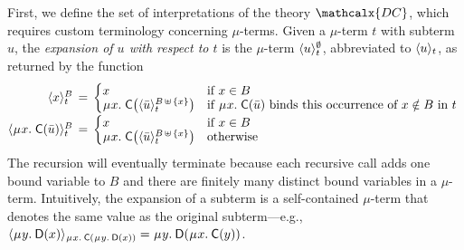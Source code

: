 \documentclass[smallcondensed,draft]{svjour3}
\newcommand\MU{\vvthinspace\mu\vvthinspace}
\newcommand\const[1]{\textsf{#1}}
\renewcommand{\vec}[1]{\bar #1}
\newcommand{\expand}[2]{\langle \smash{#2} \rangle_{#1}}
\newcommand{\thD}{\mathcalx{DC}}
\newcommand\vvthinspace{\kern+0.041667em}
\begin{document}
First, we define the set of interpretations of the theory $\thD$,
which requires custom terminology concerning $\mu$-terms.
Given a $\mu$-term $t$ with subterm $u$,
the \emph{expansion of $u$ with respect to $t$} is the $\mu$-term $\expand{t}{u}^\emptyset$,
abbreviated to
$\expand{t}{u}$, as returned by the function
\[\begin{array}{@{}r@{}c@{}l@{}}
\expand{t}{x}^B & {} \,=\, {} &
\textstyle\relax{\begin{cases}
    x & \text{if $x \in B$}   \\[-\jot]
    \MU x.\; \const{C}\smash{\bigl( \expand{t}{ \vec u}^{\smash{B \,\uplus\, \{ x \}}}\bigr)} & \text{if
    $\MU x.\; \const{C}( \vec u )$ binds this occurrence of $x \notin B$ in $t$}
\end{cases}} ~ \\
\expand{t}{\MU x.\; \const{C}( \vec u )}^B & = &
\textstyle\begin{cases}
    x & \text{if $x \in B$} \\[-\jot]
    \MU x.\; \const{C}\smash{\bigl( \expand{t}{ \vec u }^{\smash{B \,\uplus\, \{ x \}}}\bigr)} & \text{otherwise}
\end{cases}
\end{array}\]
The recursion will eventually terminate because each recursive call adds one bound
variable to $B$ and there are finitely many distinct bound variables in a $\mu$-term.
Intuitively, the expansion of a subterm is a self-contained
$\mu$-term that denotes the same value as the original subterm---\allowbreak e.g.,
$\expand{\MU x.\: \const{C}(\MU y.\: \const{D}(x))}{\MU y.\: \const{D}(x)} =
 \MU y.\: \const{D}(\MU x.\: \const{C}(y))$.
%
\end{document}
